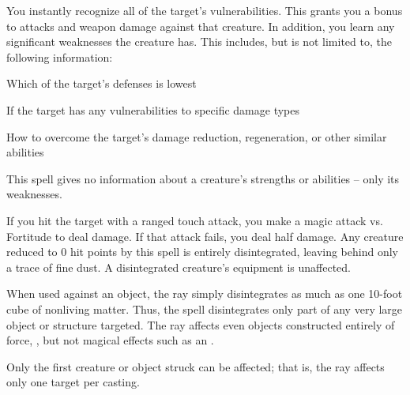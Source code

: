 \spellrng{\rngmed}
\begin{spelleffect}
  You instantly recognize all of the target's vulnerabilities. This grants you a  bonus to attacks and weapon damage against that creature. In addition, you learn any significant weaknesses the creature has. This includes, but is not limited to, the following information:
  \begin{itemize*}
    \item Which of the target's defenses is lowest
    \item If the target has any vulnerabilities to specific damage types
    \item How to overcome the target's damage reduction, regeneration, or other similar abilities
  \end{itemize*}
\end{spelleffect}
\begin{spellnotes}
  This spell gives no information about a creature's strengths or abilities -- only its weaknesses.
\end{spellnotes}

\spellrng{\rngclose}
\begin{spelleffect}
    If you hit the target with a ranged touch attack, you make a magic attack vs. Fortitude to deal damage. If that attack fails, you deal half damage. Any creature reduced to 0 hit points by this spell is entirely disintegrated, leaving behind only a trace of fine dust. A disintegrated creature's equipment is unaffected.
  \par When used against an object, the ray simply disintegrates as much as one 10-foot cube of nonliving matter. Thus, the spell disintegrates only part of any very large object or structure targeted. The ray affects even objects constructed entirely of force, , but not magical effects such as an .
\end{spelleffect}
\begin{spellnotes}
  Only the first creature or object struck can be affected; that is, the ray affects only one target per casting.
\end{spellnotes}

